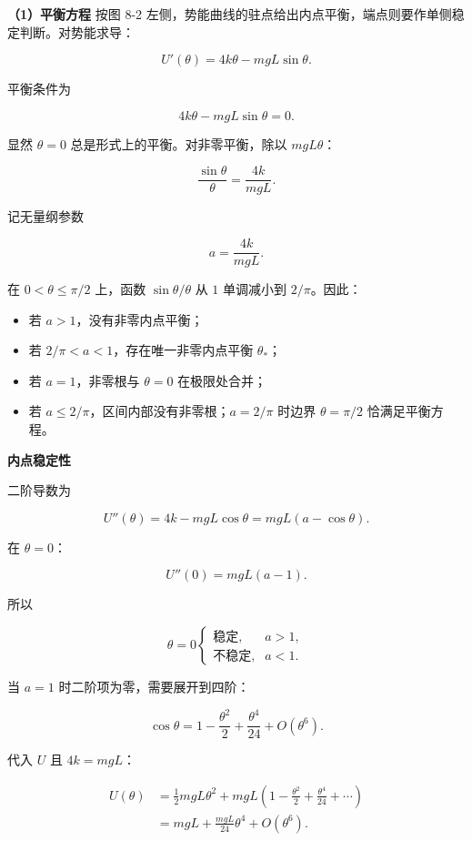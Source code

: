 \documentclass[12pt,a4paper,UTF8]{ctexart}
\newcommand{\tightlist}{\setlength{\itemsep}{0pt}\setlength{\parskip}{0pt}}
\begin{document}
\textbf{（1）平衡方程} 按图 8-2
左侧，势能曲线的驻点给出内点平衡，端点则要作单侧稳定判断。对势能求导：

\[U'(\theta)=4k\theta-mgL\sin\theta.\]

平衡条件为

\[4k\theta-mgL\sin\theta=0.\]

显然 \(\theta=0\) 总是形式上的平衡。对非零平衡，除以 \(mgL\theta\)：

\[\boxed{
\frac{\sin\theta}{\theta}=\frac{4k}{mgL}
}.\]

记无量纲参数

\[a=\frac{4k}{mgL}.\]

在 \(0<\theta\le\pi/2\) 上，函数 \(\sin\theta/\theta\) 从 \(1\)
单调减小到 \(2/\pi\)。因此：

\begin{itemize}
\tightlist
\item
  若 \(a>1\)，没有非零内点平衡；
\item
  若 \(2/\pi<a<1\)，存在唯一非零内点平衡 \(\theta_*\)；
\item
  若 \(a=1\)，非零根与 \(\theta=0\) 在极限处合并；
\item
  若 \(a\le2/\pi\)，区间内部没有非零根；\(a=2/\pi\) 时边界
  \(\theta=\pi/2\) 恰满足平衡方程。
\end{itemize}

\textbf{内点稳定性}

二阶导数为

\[U''(\theta)=4k-mgL\cos\theta
=mgL(a-\cos\theta).\]

在 \(\theta=0\)：

\[U''(0)=mgL(a-1).\]

所以

\[\boxed{
\theta=0\begin{cases}
\text{稳定},&a>1,\\
\text{不稳定},&a<1.
\end{cases}
}\]

当 \(a=1\) 时二阶项为零，需要展开到四阶：

\[\cos\theta=1-\frac{\theta^2}{2}+\frac{\theta^4}{24}+O(\theta^6).\]

代入 \(U\) 且 \(4k=mgL\)：

\[\begin{aligned}
U(\theta)
&=\frac12mgL\theta^2+mgL\left(1-\frac{\theta^2}{2}+\frac{\theta^4}{24}+\cdots\right)\\
&=mgL+\frac{mgL}{24}\theta^4+O(\theta^6).
\end{aligned}\]
\end{document}
